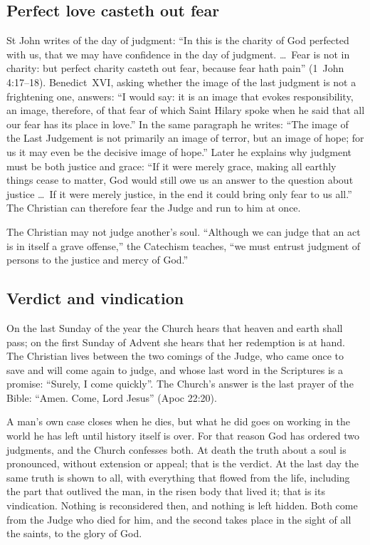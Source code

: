 \subsection{Perfect love casteth out fear}

St John writes of the day of judgment: ``In this is the charity of God perfected with us, that we may have confidence in the day of judgment. \ldots\ Fear is not in charity: but perfect charity casteth out fear, because fear hath pain'' (1~John 4:17--18). Benedict~XVI, asking whether the image of the last judgment is not a frightening one, answers: ``I would say: it is an image that evokes responsibility, an image, therefore, of that fear of which Saint Hilary spoke when he said that all our fear has its place in love.'' In the same paragraph he writes: ``The image of the Last Judgement is not primarily an image of terror, but an image of hope; for us it may even be the decisive image of hope.'' Later he explains why judgment must be both justice and grace: ``If it were merely grace, making all earthly things cease to matter, God would still owe us an answer to the question about justice \ldots\ If it were merely justice, in the end it could bring only fear to us all.'' The Christian can therefore fear the Judge and run to him at once.

The Christian may not judge another's soul. ``Although we can judge that an act is in itself a grave offense,'' the Catechism teaches, ``we must entrust judgment of persons to the justice and mercy of God.''

\subsection{Verdict and vindication}

On the last Sunday of the year the Church hears that heaven and earth shall pass; on the first Sunday of Advent she hears that her redemption is at hand. The Christian lives between the two comings of the Judge, who came once to save and will come again to judge, and whose last word in the Scriptures is a promise: ``Surely, I come quickly''. The Church's answer is the last prayer of the Bible: ``Amen. Come, Lord Jesus'' (Apoc 22:20).

A man's own case closes when he dies, but what he did goes on working in the world he has left until history itself is over. For that reason God has ordered two judgments, and the Church confesses both. At death the truth about a soul is pronounced, without extension or appeal; that is the verdict. At the last day the same truth is shown to all, with everything that flowed from the life, including the part that outlived the man, in the risen body that lived it; that is its vindication. Nothing is reconsidered then, and nothing is left hidden. Both come from the Judge who died for him, and the second takes place in the sight of all the saints, to the glory of God.
